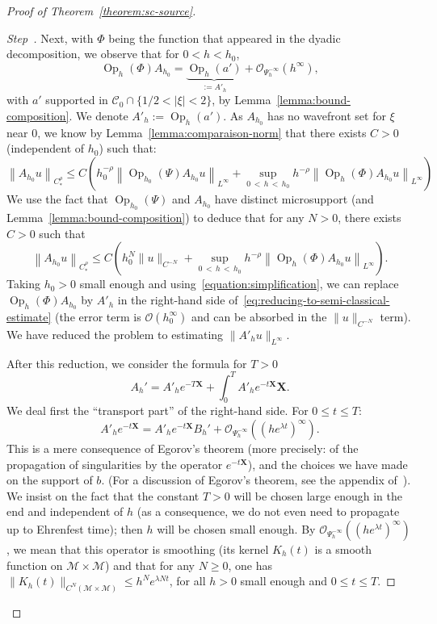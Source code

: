 \documentclass[10pt]{amsart}
\theoremstyle{definition}\newtheorem{defi}[theo]{Definition}\newtheorem{rema}[theo]{Remark}\newtheorem{exam}[theo]{Example}\newtheorem{exem}[theo]{Example}\newtheorem{nota}[theo]{Notation}
\newcommand{\X}{\mathbf{X}}
\newcommand{\mc}{\mathcal}
\newcommand{\M}{\mathcal{M}}
\newcommand{\clO}{\mathcal{O}}
\newcommand{\clC}{\mathcal{C}}
\DeclareMathOperator{\Op}{Op}
\newcounter{stepcount}
\newenvironment{step}{\refstepcounter{stepcount}\begin{proof}[Step~\thestepcount]}{\let\qed\relax\end{proof}}
\begin{document}
\begin{proof}[Proof of Theorem~\ref{theorem:sc-source}]
\begin{step}
Next, with $\Phi$ being the function that appeared in the dyadic decomposition, we observe that for $0<h<h_0$,
\begin{equation}\label{equation:simplification}
\Op_h(\Phi) A_{h_0} = \underbrace{\Op_h(a')}_{:=A'_h} + \mc{O}_{\Psi^{-\infty}_h}(h^\infty),
\end{equation}
with $a'$ supported in $\clC_0\cap \{ 1/2 < |\xi|<2\}$, by Lemma~\ref{lemma:bound-composition}. We denote $A'_h := \Op_h(a')$. As $A_{h_0}$ has no wavefront set for $\xi$ near $0$, we know by Lemma~\ref{lemma:comparaison-norm} that there exists $C > 0$ (independent of $h_0$) such that:
\begin{equation*}
\left\| A_{h_0} u \right\|_{C^\rho_\ast} \leq C \left(h_0^{-\rho} \left\|\Op_{h_0}(\Psi)A_{h_0} u \right\|_{L^\infty} + \sup_{0\,<\,h\,<\,h_0} h^{-\rho} \left\| \Op_h(\Phi) A_{h_0} u \right\|_{L^\infty}\right)
\end{equation*}
We use the fact that $\Op_{h_0}(\Psi)$ and $A_{h_0}$ have distinct microsupport (and Lemma~\ref{lemma:bound-composition}) to deduce that for any $N>0$, there exists $C>0$ such that
\begin{equation}\label{eq:reducing-to-semi-classical-estimate}
\left\| A_{h_0} u \right\|_{C^\rho_\ast} \leq C \left(h_0^N \| u \|_{C^{-N}} + \sup_{0\,<\,h\,<\,h_0} h^{-\rho} \left\| \Op_h(\Phi) A_{h_0} u \right\|_{L^\infty}\right).
\end{equation}
Taking $h_0>0$ small enough and using~\eqref{equation:simplification}, we can replace $\Op_h(\Phi) A_{h_0}$ by $A'_h$ in the right-hand side of~\eqref{eq:reducing-to-semi-classical-estimate} (the error term is $\clO(h_0^\infty)$ and can be absorbed in the $\|u\|_{C^{-N}}$ term). We have reduced the problem to estimating $\| A'_h u \|_{L^\infty}$.

After this reduction, we consider the formula for $T>0$
\begin{equation}\label{equation:ipp}
A_h' = A'_he^{-T\X} + \int_0^{T} A'_h e^{-t\X} \X.
\end{equation}
We deal first the ``transport part'' of the right-hand side. For $0 \leq t \leq T$:
\[
A'_h e^{-t \X} = A'_h e^{-t \X} B_h' + \mc{O}_{\Psi^{-\infty}_h}\left(\left(he^{\lambda t}\right)^\infty\right).
\]
This is a mere consequence of Egorov's theorem (more precisely: of the propagation of singularities by the operator $e^{-t \X}$), and the choices we have made on the support of $b$. (For a discussion of Egorov's theorem, see the appendix of~\cite[Chapter~11]{Dimassi-Sjostrand}). We insist on the fact that the constant $T > 0$ will be chosen large enough in the end and independent of $h$ (as a consequence, we do not even need to propagate up to Ehrenfest time); then $h$ will be chosen small enough. By $\mc{O}_{\Psi^{-\infty}_h}((he^{\lambda t})^\infty)$, we mean that this operator is smoothing (its kernel $K_h(t)$ is a smooth function on $\M \times \M$) and that for any $N \geq 0$, one has $\|K_h(t)\|_{C^N(\M \times \M)} \leq h^N e^{\lambda N t}$, for all $h > 0$ small enough and $0 \leq t \leq T$.


\end{step}
\end{proof}
\end{document}
